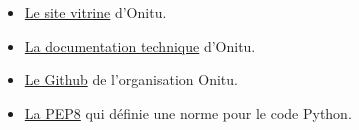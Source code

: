\begin{itemize}
\renewcommand{\labelitemi}{$\bullet$}
\item \href{http://eip.epitech.eu/2015/onitu/}{Le site vitrine} d'Onitu.
\item \href{http://onitu.readthedocs.org/en/latest/index.html}{La documentation technique} d'Onitu.
\item \href{https://github.com/onitu/}{Le Github} de l'organisation Onitu.
\item \href{http://www.python.org/dev/peps/pep-0008/}{La PEP8} qui définie une
norme pour le code Python.\\

\end{itemize}
